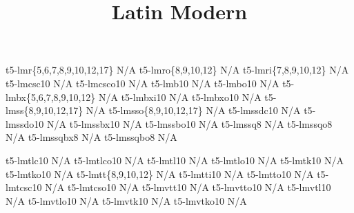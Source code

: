 \documentclass[test]{vnsample}
\title{Latin Modern}
\begin{document}
\begin{shortsample}
       {t5-lmr\{5,6,7,8,9,10,12,17\}}  {N/A}
      {t5-lmro\{8,9,10,12\}}          {N/A}
      {t5-lmri\{7,8,9,10,12\}}        {N/A}
      {t5-lmcsc10}                    {N/A}
    {t5-lmcsco10}                   {N/A}
       {t5-lmb10}                      {N/A}
      {t5-lmbo10}                     {N/A}
      {t5-lmbx\{5,6,7,8,9,10,12\}}    {N/A}
     {t5-lmbxi10}                    {N/A}
     {t5-lmbxo10}                    {N/A}
      {t5-lmss\{8,9,10,12,17\}}       {N/A}
     {t5-lmsso\{8,9,10,12,17\}}      {N/A}
    {t5-lmssdc10}                   {N/A}
   {t5-lmssdo10}                   {N/A}
     {t5-lmssbx10}                   {N/A}
    {t5-lmssbo10}                   {N/A}
     {t5-lmssq8}                     {N/A}
    {t5-lmssqo8}                    {N/A}
    {t5-lmssqbx8}                   {N/A}
   {t5-lmssqbo8}                   {N/A}
\end{shortsample}
\clearpage
\begin{shortsample}
     {t5-lmtlc10}         {N/A}
    {t5-lmtlco10}        {N/A}
     {t5-lmtl10}          {N/A}
    {t5-lmtlo10}         {N/A}
     {t5-lmtk10}          {N/A}
    {t5-lmtko10}         {N/A}
      {t5-lmtt\{8,9,10,12\}}          {N/A}
     {t5-lmtti10}                    {N/A}
     {t5-lmtto10}                    {N/A}
     {t5-lmtcsc10}                   {N/A}
   {t5-lmtcso10}        {N/A}
     {t5-lmvtt10}                    {N/A}
    {t5-lmvtto10}                   {N/A}
    {t5-lmvtl10}         {N/A}
   {t5-lmvtlo10}        {N/A}
    {t5-lmvtk10}         {N/A}
   {t5-lmvtko10}        {N/A}
\end{shortsample}
\end{document}
